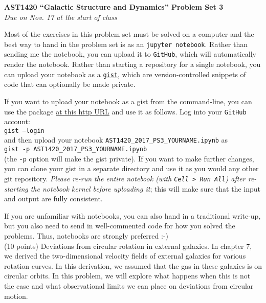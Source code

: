 \documentclass[12pt]{article}
\begin{document}
\begin{center}
{\bf \LARGE AST1420 ``Galactic Structure and Dynamics'' Problem Set 3}\\[7pt]
\emph{Due on Nov. 17 at the start of class}\\[7pt]
\end{center}

Most of the exercises in this problem set must be solved on a computer
and the best way to hand in the problem set is as an \texttt{jupyter
  notebook}. Rather than sending me the notebook, you can upload it to
\texttt{GitHub}, which will automatically render the notebook. Rather
than starting a repository for a single notebook, you can upload your
notebook as a \texttt{\href{https://gist.github.com/}{gist}}, which
are version-controlled snippets of code that can optionally be made
private.

If you want to upload your notebook as a gist from the command-line,
you can use the package \href{http://github.com/defunkt/gist}{at this
  http URL} and use it as follows. Log into your \texttt{GitHub}
account:\\

\texttt{gist --login}\\

and then upload your notebook
\texttt{AST1420\_2017\_PS3\_YOURNAME.ipynb} as\\

\texttt{gist -p AST1420\_2017\_PS3\_YOURNAME.ipynb}\\

(the \texttt{-p} option will make the gist private). If you want to
make further changes, you can clone your gist in a separate directory
and use it as you would any other git repository. \emph{Please re-run
  the entire notebook (with \texttt{Cell > Run All}) after re-starting
  the notebook kernel before uploading it}; this will make sure that
the input and output are fully consistent. 

If you are unfamiliar with notebooks, you can also hand in a
traditional write-up, but you also need to send in well-commented code
for how you solved the problems. Thus, notebooks are strongly
preferred :-)\\

 (10 points) Deviations from circular
rotation in external galaxies. In chapter 7, we derived the
two-dimensional velocity fields of external galaxies for various
rotation curves. In this derivation, we assumed that the gas in these
galaxies is on circular orbits. In this problem, we will explore what
happens when this is not the case and what observational limits we can
place on deviations from circular motion.\\
\end{document}
